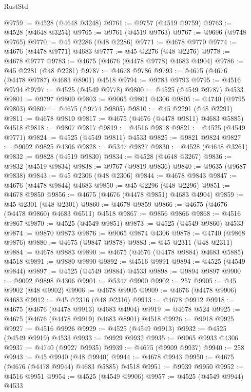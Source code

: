 \begin{lexlean}{RustStd}
\begin{coremodule}
@9759 := @4528 (@4648 @3248)
@9761 := @9757 (@4519 @9759)
@9763 := @4528 (@4648 @3254)
@9765 := @9761 (@4519 @9763)
@9767 := @9696 (@9748 @9765)
@9770 := @45 @2286 (@48 @2286)
@9771 := @4678 @9770
@9774 := @4676 (@4478 @9771) @4683
@9777 := @45 @2276 (@48 @2276)
@9778 := @4678 @9777
@9783 := @4675 (@4676 (@4478 @9778) @4683 @4904)
@9786 := @45 @2281 (@48 @2281)
@9787 := @4678 @9786
@9793 := @4675 (@4676 (@4478 @9787) @4683 @8901) @4518
@9794 := @9783 @9793
@9795 := @4516 @9794
@9797 := @4525 (@4549 @9778)
@9800 := @4525 (@4549 @9787) @4533
@9801 := @9797 @9800
@9803 := @9065 @9801 @4306
@9805 := @4740 (@9795 @9803)
@9807 := @4675 (@9774 @9805)
@9810 := @45 @2291 (@48 @2291)
@9811 := @4678 @9810
@9817 := @4675 (@4676 (@4478 @9811) @4683 @5885) @4518
@9818 := @9807 @9817
@9819 := @4516 @9818
@9821 := @4525 (@4549 @9771)
@9824 := @4525 (@4549 @9811) @4533
@9825 := @9821 @9824
@9827 := @9092 @9825 @4306
@9828 := @5347 @9827
@9830 := @4528 (@4648 @3261)
@9832 := @9828 (@4519 @9830)
@9834 := @4528 (@4648 @3267)
@9836 := @9832 (@4519 @9834)
@9838 := @9767 (@9819 @9836)
@9840 := @9635 (@9687 @9838)
@9843 := @45 @2306 (@48 @2306)
@9844 := @4678 @9843
@9847 := @4676 (@4478 @9844) @4683
@9850 := @45 @2296 (@48 @2296)
@9851 := @4678 @9850
@9856 := @4675 (@4676 (@4478 @9851) @4683 @4904)
@9859 := @45 @2301 (@48 @2301)
@9860 := @4678 @9859
@9866 := @4675 (@4676 (@4478 @9860) @4683 @6511) @4518
@9867 := @9856 @9866
@9868 := @4516 @9867
@9870 := @4525 (@4549 @9851)
@9873 := @4525 (@4549 @9860) @4533
@9874 := @9870 @9873
@9876 := @9065 @9874 @4306
@9878 := @4740 (@9868 @9876)
@9880 := @4675 (@9847 @9878)
@9883 := @45 @2311 (@48 @2311)
@9884 := @4678 @9883
@9890 := @4675 (@4676 (@4478 @9884) @4683 @5885) @4518
@9891 := @9880 @9890
@9892 := @4516 @9891
@9894 := @4525 (@4549 @9844)
@9897 := @4525 (@4549 @9884) @4533
@9898 := @9894 @9897
@9900 := @9092 @9898 @4306
@9901 := @5347 @9900
@9902 := 257
@9905 := @45 @9902 (@48 @9902)
@9906 := @4678 @9905
@9909 := @4676 (@4478 @9906) @4683
@9912 := @45 @2316 (@48 @2316)
@9913 := @4678 @9912
@9918 := @4675 (@4676 (@4478 @9913) @4683 @4904)
@9919 := @4678 @524
@9925 := @4675 (@4676 (@4478 @9919) @4683 @8901) @4518
@9926 := @9918 @9925
@9927 := @4516 @9926
@9929 := @4525 (@4549 @9913)
@9932 := @4525 (@4549 @9919) @4533
@9933 := @9929 @9932
@9935 := @9065 @9933 @4306
@9937 := @4740 (@9927 @9935)
@9939 := @4675 (@9909 @9937)
@9940 := 258
@9943 := @45 @9940 (@48 @9940)
@9944 := @4678 @9943
@9950 := @4675 (@4676 (@4478 @9944) @4683 @5885) @4518
@9951 := @9939 @9950
@9952 := @4516 @9951
@9954 := @4525 (@4549 @9906)
@9957 := @4525 (@4549 @9944) @4533

\end{coremodule}
\end{lexlean}
